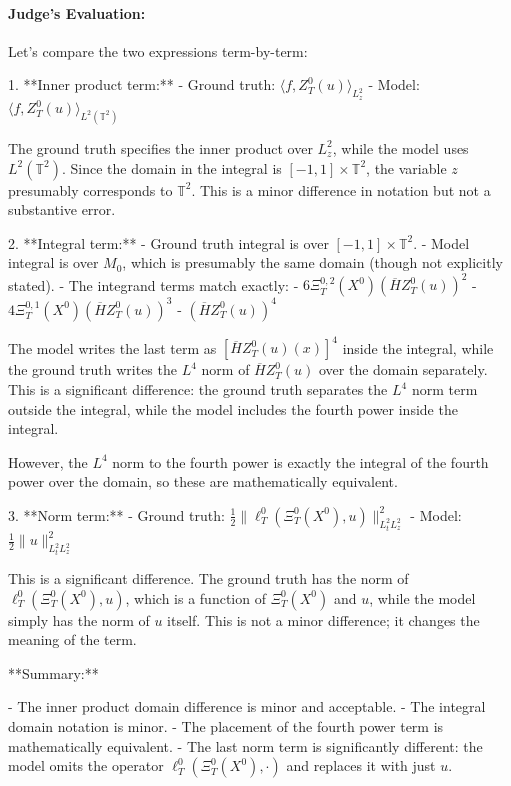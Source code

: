 \documentclass[10pt]{article}
\begin{document}
\paragraph*{Judge's Evaluation:}

Let's compare the two expressions term-by-term:

1. **Inner product term:**
   - Ground truth: \(\langle f, Z^0_T(u) \rangle_{L^2_z}\)
   - Model: \(\langle f, Z^0_T(u) \rangle_{L^2(\mathbb{T}^2)}\)

   The ground truth specifies the inner product over \(L^2_z\), while the model uses \(L^2(\mathbb{T}^2)\). Since the domain in the integral is \([-1,1] \times \mathbb{T}^2\), the variable \(z\) presumably corresponds to \(\mathbb{T}^2\). This is a minor difference in notation but not a substantive error.

2. **Integral term:**
   - Ground truth integral is over \([-1,1] \times \mathbb{T}^2\).
   - Model integral is over \(M_0\), which is presumably the same domain (though not explicitly stated).
   - The integrand terms match exactly: 
     - \(6 \Xi^{0,2}_T(X^0) (\overline H Z^0_T(u))^2\)
     - \(4 \Xi^{0,1}_T(X^0) (\overline H Z^0_T(u))^3\)
     - \((\overline H Z^0_T(u))^4\)

   The model writes the last term as \([\overline H Z^0_T(u)(x)]^4\) inside the integral, while the ground truth writes the \(L^4\) norm of \(\overline H Z^0_T(u)\) over the domain separately. This is a significant difference: the ground truth separates the \(L^4\) norm term outside the integral, while the model includes the fourth power inside the integral.

   However, the \(L^4\) norm to the fourth power is exactly the integral of the fourth power over the domain, so these are mathematically equivalent.

3. **Norm term:**
   - Ground truth: \(\frac{1}{2} \|\ell^0_T(\Xi^0_T(X^0), u)\|_{L^2_t L^2_z}^2\)
   - Model: \(\frac{1}{2} \|u\|_{L^2_t L^2_z}^2\)

   This is a significant difference. The ground truth has the norm of \(\ell^0_T(\Xi^0_T(X^0), u)\), which is a function of \(\Xi^0_T(X^0)\) and \(u\), while the model simply has the norm of \(u\) itself. This is not a minor difference; it changes the meaning of the term.

**Summary:**

- The inner product domain difference is minor and acceptable.
- The integral domain notation is minor.
- The placement of the fourth power term is mathematically equivalent.
- The last norm term is significantly different: the model omits the operator \(\ell^0_T(\Xi^0_T(X^0), \cdot)\) and replaces it with just \(u\).
\end{document}
